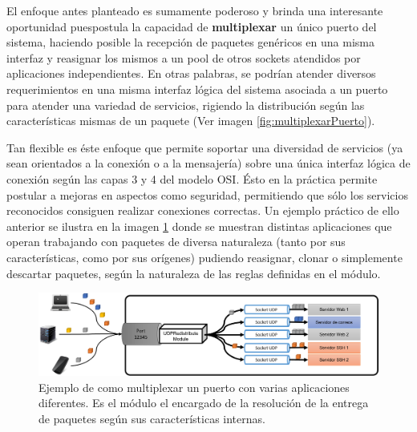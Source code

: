 El enfoque antes planteado es sumamente poderoso y brinda una interesante oportunidad puespostula la capacidad de \textbf{multiplexar} un único puerto del sistema, haciendo posible la recepción de paquetes genéricos en una misma interfaz y reasignar los mismos a un pool de otros sockets atendidos por aplicaciones independientes. En otras palabras, se podrían atender diversos requerimientos en una misma interfaz lógica del sistema asociada a un puerto para atender una variedad de servicios, rigiendo la distribución según las características mismas de un paquete (Ver imagen \ref{fig:multiplexarPuerto}).

Tan flexible es éste enfoque que permite soportar una diversidad de servicios (ya sean orientados a la conexión o a la mensajería) sobre una única interfaz lógica de conexión según las capas 3 y 4 del modelo OSI. Ésto en la práctica permite postular a mejoras en aspectos como seguridad, permitiendo que sólo los servicios reconocidos consiguen realizar conexiones correctas. Un ejemplo práctico de ello anterior se ilustra en la imagen \ref{fig:multiplexarPuertoEjemplo} donde se muestran distintas aplicaciones que operan trabajando con paquetes de diversa naturaleza (tanto por sus características, como por sus orígenes) pudiendo reasignar, clonar o simplemente descartar paquetes, según la naturaleza de las reglas definidas en el módulo.

\begin{figure}[!h]
	\centering
	\includegraphics[scale=.6]{imagenes/udpredistributeapplications.png}
	\caption{Ejemplo de como multiplexar un puerto con varias aplicaciones diferentes. Es el módulo el encargado de la resolución de la entrega de paquetes según sus características internas.}
	\label{fig:multiplexarPuertoEjemplo}
\end{figure}
